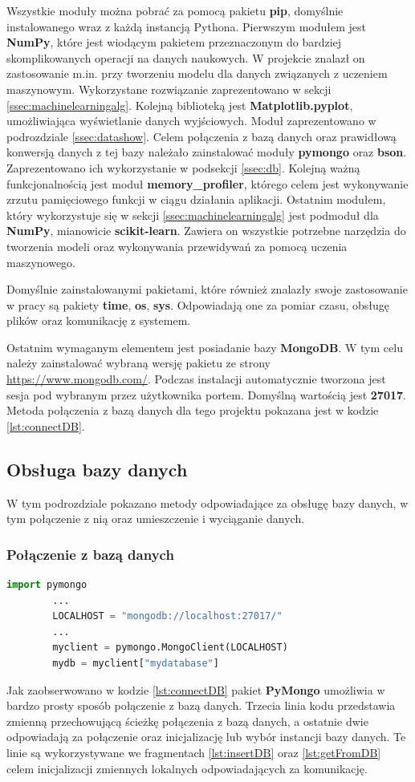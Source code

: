 Wszystkie moduły można pobrać za pomocą pakietu \textbf{pip}, domyślnie instalowanego wraz z każdą instancją Pythona. Pierwszym modułem jest \textbf{NumPy}, które jest wiodącym pakietem przeznaczonym do bardziej skomplikowanych operacji na danych naukowych. W projekcie znalazł on zastosowanie m.in. przy tworzeniu modelu dla danych związanych z uczeniem maszynowym. Wykorzystane rozwiązanie zaprezentowano w sekcji \ref{ssec:machinelearningalg}. Kolejną biblioteką jest \textbf{Matplotlib.pyplot}, umożliwiająca wyświetlanie danych wyjściowych. Moduł zaprezentowano w podrozdziale \ref{ssec:datashow}. Celem połączenia z bazą danych oraz prawidłową konwersją danych z tej bazy należało zainstalować moduły \textbf{pymongo} oraz \textbf{bson}. Zaprezentowano ich wykorzystanie w podsekcji \ref{ssec:db}. Kolejną ważną funkcjonalnością jest moduł \textbf{memory\_profiler}, którego celem jest wykonywanie zrzutu pamięciowego funkcji w ciągu działania aplikacji. Ostatnim modułem, który wykorzystuje się w sekcji \ref{ssec:machinelearningalg} jest podmoduł dla \textbf{NumPy}, mianowicie \textbf{scikit-learn}. Zawiera on wszystkie potrzebne narzędzia do tworzenia modeli oraz wykonywania przewidywań za pomocą uczenia maszynowego.\par
Domyślnie zainstalowanymi pakietami, które również znalazły swoje zastosowanie w pracy są pakiety \textbf{time}, \textbf{os}, \textbf{sys}. Odpowiadają one za pomiar czasu, obsługę plików oraz komunikację z systemem.\par
Ostatnim wymaganym elementem jest posiadanie bazy \textbf{MongoDB}. W tym celu należy zainstalować wybraną wersję pakietu ze strony \url{https://www.mongodb.com/}. Podczas instalacji automatycznie tworzona jest sesja pod wybranym przez użytkownika portem. Domyślną wartością jest \textbf{27017}. Metoda połączenia z bazą danych dla tego projektu pokazana jest w kodzie \ref{lst:connectDB}.
\subsection{Obsługa bazy danych}
W tym podrozdziale pokazano metody odpowiadające za obsługę bazy danych, w tym połączenie z nią oraz umieszczenie i wyciąganie danych.
\label{ssec:db}
\subsubsection{Połączenie z bazą danych}
\begin{lstlisting}[language=Python, caption=Połączenie z bazą danych, label={lst:connectDB}]
        import pymongo
        ...
        LOCALHOST = "mongodb://localhost:27017/"
        ...
        myclient = pymongo.MongoClient(LOCALHOST)
        mydb = myclient["mydatabase"]
\end{lstlisting}
Jak zaobserwowano w kodzie \ref{lst:connectDB} pakiet \textbf{PyMongo} umożliwia w bardzo prosty sposób połączenie z bazą danych. Trzecia linia kodu przedstawia zmienną przechowującą ścieżkę połączenia z bazą danych, a ostatnie dwie odpowiadają za połączenie oraz inicjalizację lub wybór instancji bazy danych. Te linie są wykorzystywane we fragmentach \ref{lst:insertDB} oraz \ref{lst:getFromDB} celem inicjalizacji zmiennych lokalnych odpowiadających za komunikację.
